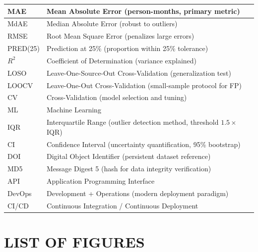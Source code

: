 \documentclass[11pt,a4paper]{article}
\begin{document}
\begin{table}[h]
\begin{tabular}{|l|l|}
\hline
MAE & Mean Absolute Error (person-months, primary metric) \\
\hline
MdAE & Median Absolute Error (robust to outliers) \\
\hline
RMSE & Root Mean Square Error (penalizes large errors) \\
\hline
PRED(25) & Prediction at 25\% (proportion within 25\% tolerance) \\
\hline
$R^2$ & Coefficient of Determination (variance explained) \\
\hline
LOSO & Leave-One-Source-Out Cross-Validation (generalization test) \\
\hline
LOOCV & Leave-One-Out Cross-Validation (small-sample protocol for FP) \\
\hline
CV & Cross-Validation (model selection and tuning) \\
\hline
ML & Machine Learning \\
\hline
IQR & Interquartile Range (outlier detection method, threshold $1.5 \times$ IQR) \\
\hline
CI & Confidence Interval (uncertainty quantification, 95\% bootstrap) \\
\hline
DOI & Digital Object Identifier (persistent dataset reference) \\
\hline
MD5 & Message Digest 5 (hash for data integrity verification) \\
\hline
API & Application Programming Interface \\
\hline
DevOps & Development + Operations (modern deployment paradigm) \\
\hline
CI/CD & Continuous Integration / Continuous Deployment \\
\hline
\end{tabular}
\end{table}

\newpage

\section*{LIST OF FIGURES}

\vspace{0.3cm}
\end{document}
